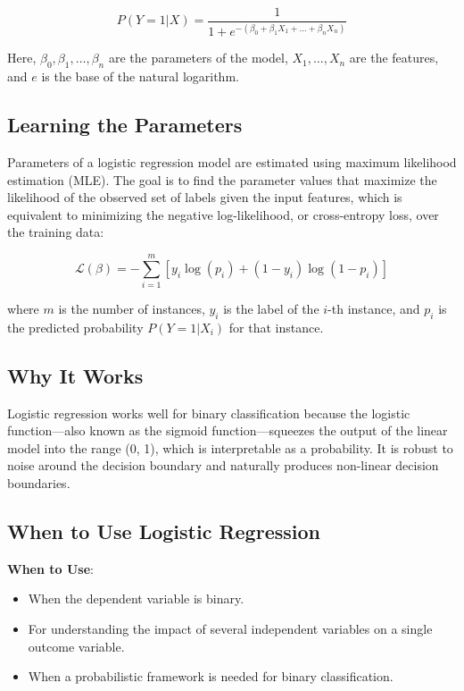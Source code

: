 \documentclass[12pt]{article}
\begin{document}
\[ P(Y=1|X) = \frac{1}{1 + e^{-(\beta_0 + \beta_1 X_1 + \dots + \beta_n X_n)}} \]

Here, \( \beta_0, \beta_1, \ldots, \beta_n \) are the parameters of the model, \( X_1, \ldots, X_n \) are the features, and \( e \) is the base of the natural logarithm.

\subsection{Learning the Parameters}

Parameters of a logistic regression model are estimated using maximum likelihood estimation (MLE). The goal is to find the parameter values that maximize the likelihood of the observed set of labels given the input features, which is equivalent to minimizing the negative log-likelihood, or cross-entropy loss, over the training data:

\[ \mathcal{L}(\beta) = -\sum_{i=1}^{m} [y_i \log(p_i) + (1 - y_i) \log(1 - p_i)] \]

where \( m \) is the number of instances, \( y_i \) is the label of the \( i \)-th instance, and \( p_i \) is the predicted probability \( P(Y=1|X_i) \) for that instance.

\subsection{Why It Works}

Logistic regression works well for binary classification because the logistic function—also known as the sigmoid function—squeezes the output of the linear model into the range (0, 1), which is interpretable as a probability. It is robust to noise around the decision boundary and naturally produces non-linear decision boundaries.

\subsection{When to Use Logistic Regression}

\textbf{When to Use}:
\begin{itemize}
    \item When the dependent variable is binary.
    \item For understanding the impact of several independent variables on a single outcome variable.
    \item When a probabilistic framework is needed for binary classification.
\end{itemize}
\end{document}
